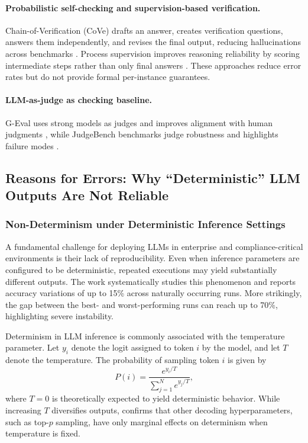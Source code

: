 \paragraph{Probabilistic self-checking and supervision-based verification.}
Chain-of-Verification (CoVe) drafts an answer, creates verification questions, answers them independently, and revises the final output,
reducing hallucinations across benchmarks \cite{dhuliawala2024cove}.
Process supervision improves reasoning reliability by scoring intermediate steps rather than only final answers \cite{lightman2023verify}.
These approaches reduce error rates but do not provide formal per-instance guarantees.

\paragraph{LLM-as-judge as checking baseline.}
G-Eval uses strong models as judges and improves alignment with human judgments \cite{liu2023geval},
while JudgeBench benchmarks judge robustness and highlights failure modes \cite{tan2024judgebench}.

\subsection{Reasons for Errors: Why ``Deterministic'' LLM Outputs Are Not Reliable}
\label{subsec:reasons}

\subsubsection{Non-Determinism under Deterministic Inference Settings}
\label{subsec:nondeterminism}

A fundamental challenge for deploying LLMs in enterprise and compliance-critical environments is their lack of reproducibility.
Even when inference parameters are configured to be deterministic, repeated executions may yield substantially different outputs.
The work \cite{nondeterminism_llm_settings} systematically studies this phenomenon and reports accuracy variations of up to 15\% across naturally occurring runs.
More strikingly, the gap between the best- and worst-performing runs can reach up to 70\%, highlighting severe instability.

Determinism in LLM inference is commonly associated with the temperature parameter.
Let $y_i$ denote the logit assigned to token $i$ by the model, and let $T$ denote the temperature.
The probability of sampling token $i$ is given by
\begin{equation}
P(i) = \frac{e^{y_i / T}}{\sum_{j=1}^{N} e^{y_j / T}} ,
\label{eq:softmax_temperature}
\end{equation}
where $T=0$ is theoretically expected to yield deterministic behavior.
While increasing $T$ diversifies outputs, \cite{nondeterminism_llm_settings} confirms that other decoding hyperparameters,
such as top-$p$ sampling, have only marginal effects on determinism when temperature is fixed.

